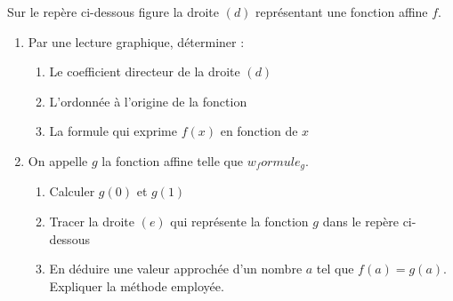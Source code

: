\begin{exo}
    Sur le repère ci-dessous figure la droite $(d)$ représentant une fonction affine $f$. 

    \begin{enumerate}
        \item Par une lecture graphique, déterminer :
        \begin{enumerate}
            \item Le coefficient directeur de la droite $(d)$
            \item L'ordonnée à l'origine de la fonction
            \item La formule qui exprime $f(x)$ en fonction de $x$
        \end{enumerate}
        \item On appelle $g$ la fonction affine telle que ${w_formule_g}$.
        \begin{enumerate}
            \item Calculer $g(0)$ et $g(1)$
            \item Tracer la droite $(e)$ qui représente la fonction $g$ dans le repère ci-dessous
            \item En déduire une valeur approchée d'un nombre $a$ tel que $f(a)=g(a)$. Expliquer la méthode employée.
        \end{enumerate}
    \end{enumerate}
\end{exo}


\vspace{0.5cm}

\vspace{0.5cm}

